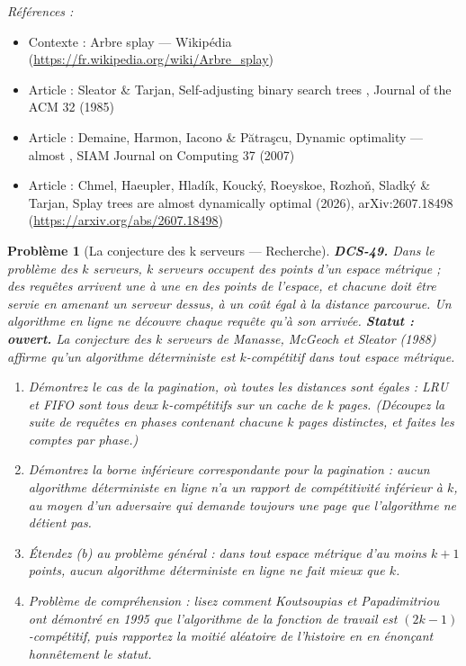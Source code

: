 \documentclass[11pt]{article}
\newtheorem{problem}{Problème}
\newenvironment{refs}{\par\small\noindent\emph{Références :}\begin{itemize}\setlength\itemsep{0pt}}{\end{itemize}\normalsize}
\begin{document}
\begin{refs}
\item Contexte : Arbre splay --- Wikipédia (\url{https://fr.wikipedia.org/wiki/Arbre_splay})
\item Article : Sleator \& Tarjan, \og{} Self-adjusting binary search trees \fg{}, Journal of the ACM 32 (1985)
\item Article : Demaine, Harmon, Iacono \& P\u{a}tra\c{s}cu, \og{} Dynamic optimality --- almost \fg{}, SIAM Journal on Computing 37 (2007)
\item Article : Chmel, Haeupler, Hladík, Koucký, Roeyskoe, Rozho\v{n}, Sladký \& Tarjan, \og{} Splay trees are almost dynamically optimal \fg{} (2026), arXiv:2607.18498 (\url{https://arxiv.org/abs/2607.18498})
\end{refs}

\bigskip

\begin{problem}[{La conjecture des k serveurs --- Recherche}]
\textbf{DCS-49.} Dans le problème des $ k $ serveurs, $ k $ serveurs occupent des points d'un espace métrique ; des requêtes arrivent une à une en des points de l'espace, et chacune doit être servie en amenant un serveur dessus, à un coût égal à la distance parcourue. Un algorithme en ligne ne découvre chaque requête qu'à son arrivée. \textbf{Statut : ouvert.} La conjecture des $ k $ serveurs de Manasse, McGeoch et Sleator (1988) affirme qu'un algorithme déterministe est $ k $-compétitif dans tout espace métrique.
\begin{enumerate}
\item[(a)] Démontrez le cas de la pagination, où toutes les distances sont égales : LRU et FIFO sont tous deux $ k $-compétitifs sur un cache de $ k $ pages. (Découpez la suite de requêtes en phases contenant chacune $ k $ pages distinctes, et faites les comptes par phase.)
\item[(b)] Démontrez la borne inférieure correspondante pour la pagination : aucun algorithme déterministe en ligne n'a un rapport de compétitivité inférieur à $ k $, au moyen d'un adversaire qui demande toujours une page que l'algorithme ne détient pas.
\item[(c)] Étendez (b) au problème général : dans tout espace métrique d'au moins $ k+1 $ points, aucun algorithme déterministe en ligne ne fait mieux que $ k $.
\item[(d)] Problème de compréhension : lisez comment Koutsoupias et Papadimitriou ont démontré en 1995 que l'algorithme de la fonction de travail est $ (2k-1) $-compétitif, puis rapportez la moitié aléatoire de l'histoire en en énonçant honnêtement le statut.
\end{enumerate}

\end{problem}
\end{document}
